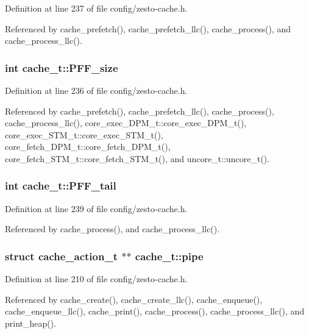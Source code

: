 Definition at line 237 of file config/zesto-cache.h.

Referenced by cache\_\-prefetch(), cache\_\-prefetch\_\-llc(), cache\_\-process(), and cache\_\-process\_\-llc().
\subsubsection[{PFF\_\-size}]{\setlength{\rightskip}{0pt plus 5cm}int {\bf cache\_\-t::PFF\_\-size}}\label{structcache__t_33b4c70f19ea323d92f12d023e14f8ec}




Definition at line 236 of file config/zesto-cache.h.

Referenced by cache\_\-prefetch(), cache\_\-prefetch\_\-llc(), cache\_\-process(), cache\_\-process\_\-llc(), core\_\-exec\_\-DPM\_\-t::core\_\-exec\_\-DPM\_\-t(), core\_\-exec\_\-STM\_\-t::core\_\-exec\_\-STM\_\-t(), core\_\-fetch\_\-DPM\_\-t::core\_\-fetch\_\-DPM\_\-t(), core\_\-fetch\_\-STM\_\-t::core\_\-fetch\_\-STM\_\-t(), and uncore\_\-t::uncore\_\-t().
\subsubsection[{PFF\_\-tail}]{\setlength{\rightskip}{0pt plus 5cm}int {\bf cache\_\-t::PFF\_\-tail}}\label{structcache__t_64f8b519174acebb9537d0be9834e9cb}




Definition at line 239 of file config/zesto-cache.h.

Referenced by cache\_\-process(), and cache\_\-process\_\-llc().
\subsubsection[{pipe}]{\setlength{\rightskip}{0pt plus 5cm}struct {\bf cache\_\-action\_\-t} $\ast$$\ast$ {\bf cache\_\-t::pipe}\hspace{0.3cm}{\tt  [read]}}\label{structcache__t_e4c32b43be7203fa1ac5b58e5d22e520}




Definition at line 210 of file config/zesto-cache.h.

Referenced by cache\_\-create(), cache\_\-create\_\-llc(), cache\_\-enqueue(), cache\_\-enqueue\_\-llc(), cache\_\-print(), cache\_\-process(), cache\_\-process\_\-llc(), and print\_\-heap().
